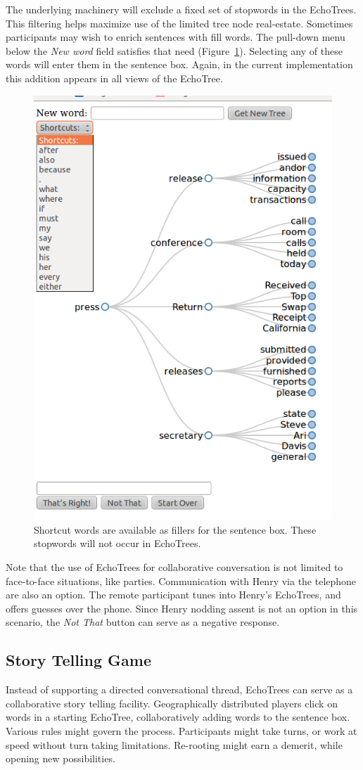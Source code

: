 \documentclass{sigchi}
\begin{document}
The underlying machinery will exclude a fixed set of stopwords in the
EchoTrees. This filtering helps maximize use of the limited tree node
real-estate. Sometimes participants may wish to enrich sentences with
fill words. The pull-down menu below the {\em New word} field
satisfies that need (Figure~\ref{fig:shortcuts}). Selecting any of
these words will enter them in the sentence box. Again, in the current
implementation this addition appears in all views of the EchoTree.
\begin{figure}
   \centering
   \includegraphics[width=0.5\columnwidth]{Figs/echoTreePulldownSnapshotSmall.png}
   \caption{Shortcut words are available as fillers for the sentence
     box. These stopwords will not occur in EchoTrees.}
   \label{fig:shortcuts}
\end{figure}
Note that the use of EchoTrees for collaborative conversation is not
limited to face-to-face situations, like parties. Communication
with Henry via the telephone are also an option. The remote
participant tunes into Henry's EchoTrees, and offers guesses over the
phone. Since Henry nodding assent is not an option in this scenario,
the {\em Not That} button can serve as a negative response.

\subsection{Story Telling Game}
Instead of supporting a directed conversational thread, EchoTrees can
serve as a collaborative story telling facility. Geographically
distributed players click on words in a starting EchoTree,
collaboratively adding words to the sentence box. Various rules might
govern the process. Participants might take turns, or work at speed
without turn taking limitations. Re-rooting might earn a demerit,
while opening new possibilities.
\end{document}
